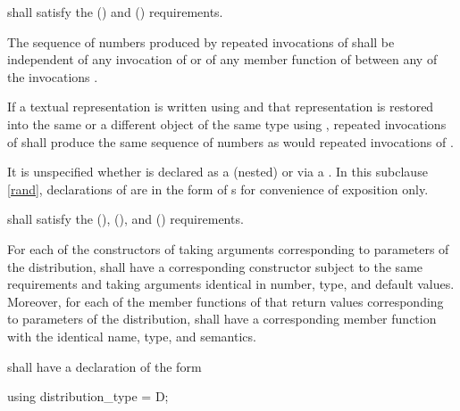 \pnum
{} shall satisfy the
 ()
and  () requirements.

\pnum
The sequence of numbers
produced by repeated invocations of 
shall be independent of any invocation of
or of
any  member function of 
between any of the invocations .

\pnum
If a textual representation is written using 
and that representation is restored
into the same or a different object 
of the same type using ,
repeated invocations of 
shall produce the same sequence of numbers
as would repeated invocations of .

\pnum
It is unspecified whether 
is declared as a (nested) 
or via a .
In this subclause \ref{rand},
declarations of 
are in the form of s
for convenience of exposition only.

\pnum
{} shall satisfy the
 (),
 (),
and
 () requirements.

\pnum
For each of the constructors of 
taking arguments corresponding to parameters of the distribution,
 shall have a corresponding constructor
subject to the same requirements
and taking arguments identical in number, type, and default values.
Moreover,
for each of the member functions of 
that return values corresponding to parameters of the distribution,
 shall have a corresponding member function
with the identical name, type, and semantics.

\pnum
{} shall have a declaration of the form
\begin{codeblock}
using distribution_type =  D;
\end{codeblock}

%
%




